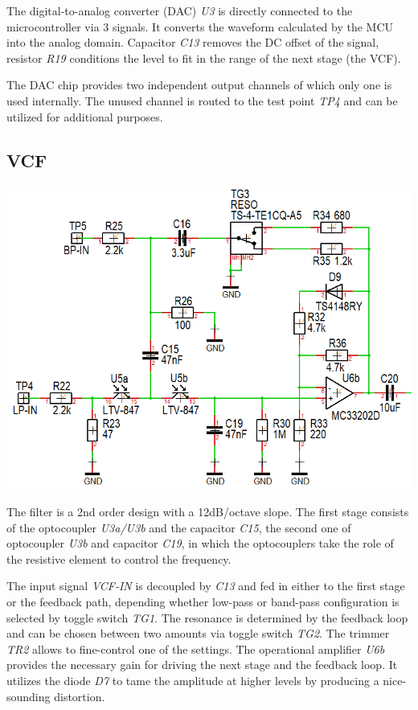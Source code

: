 \documentclass{scrartcl}
\begin{document}
The digital-to-analog converter (DAC) \emph{U3} is directly connected to the microcontroller via 3 signals. It converts the waveform calculated by the MCU into the analog domain. Capacitor \emph{C13} removes the DC offset of the signal, resistor \emph{R19} conditions the level to fit in the range of the next stage (the VCF).

The DAC chip provides two independent output channels of which only one is used internally. The unused channel is routed to the test point \emph{TP4} and can be utilized for additional purposes.

\subsection{VCF}

\begin{center}
    \includegraphics[scale=0.50]{assets/schema-vcf.png}
\end{center}

The filter is a 2nd order design with a 12dB/octave slope. The first stage consists of the optocoupler \emph{U3a/U3b} and the capacitor \emph{C15}, the second one of optocoupler \emph{U3b} and capacitor \emph{C19}, in which the optocouplers take the role of the resistive element to control the frequency.

The input signal \emph{VCF-IN} is decoupled by \emph{C13} and fed in either to the first stage or the feedback path, depending whether low-pass or band-pass configuration is selected by toggle switch \emph{TG1}. The resonance is determined by the feedback loop and can be chosen between two amounts via toggle switch \emph{TG2}. The trimmer \emph{TR2} allows to fine-control one of the settings. The operational amplifier \emph{U6b} provides the necessary gain for driving the next stage and the feedback loop. It utilizes the diode \emph{D7} to tame the amplitude at higher levels by producing a nice-sounding distortion.
\end{document}
